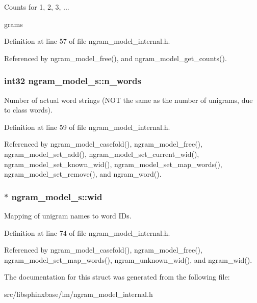 \-Counts for 1, 2, 3, ... 

grams 

\-Definition at line 57 of file ngram\-\_\-model\-\_\-internal.\-h.



\-Referenced by ngram\-\_\-model\-\_\-free(), and ngram\-\_\-model\-\_\-get\-\_\-counts().

\subsubsection[{n\-\_\-words}]{\setlength{\rightskip}{0pt plus 5cm}int32 {\bf ngram\-\_\-model\-\_\-s\-::n\-\_\-words}}\label{structngram__model__s_a74f85927ef0d5513a1e6c02d13864be3}


\-Number of actual word strings (\-N\-O\-T the same as the number of unigrams, due to class words). 



\-Definition at line 59 of file ngram\-\_\-model\-\_\-internal.\-h.



\-Referenced by ngram\-\_\-model\-\_\-casefold(), ngram\-\_\-model\-\_\-free(), ngram\-\_\-model\-\_\-set\-\_\-add(), ngram\-\_\-model\-\_\-set\-\_\-current\-\_\-wid(), ngram\-\_\-model\-\_\-set\-\_\-known\-\_\-wid(), ngram\-\_\-model\-\_\-set\-\_\-map\-\_\-words(), ngram\-\_\-model\-\_\-set\-\_\-remove(), and ngram\-\_\-word().

\subsubsection[{wid}]{$\ast$ {\bf ngram\-\_\-model\-\_\-s\-::wid}}\label{structngram__model__s_a75567419a8002ef6e916c81f5d9ee9ed}


\-Mapping of unigram names to word \-I\-Ds. 



\-Definition at line 74 of file ngram\-\_\-model\-\_\-internal.\-h.



\-Referenced by ngram\-\_\-model\-\_\-casefold(), ngram\-\_\-model\-\_\-free(), ngram\-\_\-model\-\_\-set\-\_\-map\-\_\-words(), ngram\-\_\-unknown\-\_\-wid(), and ngram\-\_\-wid().



\-The documentation for this struct was generated from the following file\-:\begin{DoxyCompactItemize}
\item 
src/libsphinxbase/lm/ngram\-\_\-model\-\_\-internal.\-h\end{DoxyCompactItemize}
